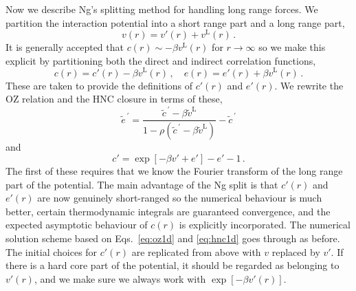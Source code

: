 \documentclass[12pt,a4paper]{article}
\newcommand{\lr}{^{\mathrm{L}}}
\newcommand{\tildevlr}{{\tilde v}\lr}
\newcommand{\myprime}{^{{}\,\prime}}
\newcommand{\Eqsref}[1]{Eqs.~\eqref{#1}}
\begin{document}
Now we describe Ng's splitting method for handling long range forces.
We partition the interaction potential into a short range part and a
long range part,
%
\begin{equation}
v(r)=v'(r)+v\lr(r)\,.
\end{equation}
%
It is generally accepted that $c(r)\sim-\beta v\lr(r)$ for
$r\to\infty$ so we make this explicit by partitioning both the direct
and indirect correlation functions,
%
\begin{equation}
c(r)=c'(r)-\beta v\lr(r)\,,\quad
e(r)=e'(r)+\beta v\lr(r)\,.
\end{equation}
%
These are taken to provide the definitions of $c'(r)$ and $e'(r)$.  We
rewrite the OZ relation and the HNC closure in terms of these,
%
\begin{equation}
\tilde e\myprime=\frac{\tilde c\myprime-\beta\tildevlr}{1-\rho(\tilde
  c\myprime-\beta\tildevlr)}-\tilde c\myprime
\label{eq:oz1d}
\end{equation}
and
\begin{equation}
c'=\exp[-\beta v'+e']-e'-1\,.
\label{eq:hnc1d}
\end{equation}
%
The first of these requires that we know the Fourier transform of the
long range part of the potential.  The main advantage of the Ng split
is that $c'(r)$ and $e'(r)$ are now genuinely short-ranged so the
numerical behaviour is much better, certain thermodynamic integrals
are guaranteed convergence, and the expected asymptotic behaviour of
$c(r)$ is explicitly incorporated.  The numerical solution scheme
based on \Eqsref{eq:oz1d} and \eqref{eq:hnc1d} goes through as before.
The initial choices for $c'(r)$ are replicated from above with $v$
replaced by $v'$.  If there is a hard core part of the potential, it
should be regarded as belonging to $v'(r)$, and we make sure we always
work with $\exp[-\beta v'(r)]$.
\end{document}
